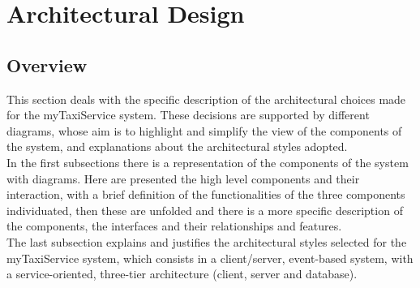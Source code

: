 

%

\newpage
	\section{Architectural Design}
		\subsection{Overview}
			This section deals with the specific description of the architectural choices made for the myTaxiService system. These decisions are supported by different diagrams, whose aim is to highlight and simplify the view of the components of the system, and explanations about the architectural styles adopted.
			\\In the first subsections there is a representation of the components of the system with diagrams. Here are presented the high level components and their interaction, with a brief definition of the functionalities of the three components individuated, then these are unfolded and there is a more specific description of the components, the interfaces and their relationships and features.\\
			The last subsection explains and justifies the architectural styles selected for the myTaxiService system, which consists in a client/server, event-based system, with a service-oriented, three-tier architecture (client, server and database). 
			
	
\newpage

